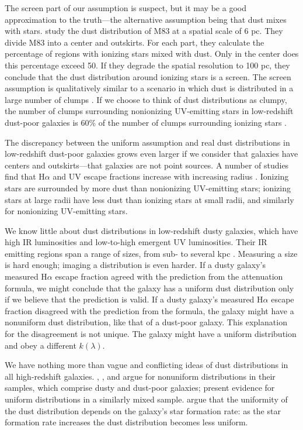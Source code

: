 \documentclass[preprint]{aastex}
\begin{document}
The screen part of our assumption is suspect, but it may be a
good approximation to the truth---the alternative assumption being that dust
mixes with stars.  \citet{liu13} study the dust distribution of M83 at a
spatial scale of 6 pc.  They divide M83 into a center and outskirts.  For each
part, they calculate the percentage of regions with ionizing stars mixed with
dust.  Only in the center does this percentage exceed 50.  If they degrade the
spatial resolution to 100 pc, they conclude that the dust distribution around
ionizing stars is a screen.  The screen assumption is qualitatively similar to
a scenario in which dust is distributed in a large number of clumps
\citep{calzetti94}.  If we choose to think of dust distributions as clumpy, the
number of clumps surrounding nonionizing UV-emitting stars in low-redshift
dust-poor galaxies is 60\% of the number of clumps surrounding ionizing stars
\citep{calzetti97a}.

The discrepancy between the uniform assumption and real dust
distributions in low-redshift dust-poor galaxies grows even larger if we
consider that galaxies have centers and outskirts---that galaxies are not
point sources.  A number of studies find
that H$\alpha$ and UV escape fractions increase with increasing radius
\citep{boissier04,prescott07,munoz09}.  Ionizing stars are surrounded by more
dust than nonionizing UV-emitting stars; ionizing stars
at large radii have less dust than ionizing stars at small radii, and similarly
for nonionizing UV-emitting stars.

We know little about dust distributions in low-redshift dusty galaxies, which
have high IR luminosities and low-to-high emergent UV luminosities.  Their
IR emitting regions span a range of sizes, from sub- to several kpc
\citep{diaz10}.  Measuring a size is hard enough; imaging a distribution is
even harder.  If a dusty galaxy's measured H$\alpha$ escape fraction agreed with
the prediction from the \citet{calzetti00} attenuation formula, we might
conclude that the galaxy has a uniform dust distribution only if we believe
that the prediction is valid.  If a dusty galaxy's measured H$\alpha$
escape fraction disagreed with the prediction from the \citet{calzetti00}
formula, the galaxy might have a nonuniform dust distribution, like that of a
dust-poor galaxy.  This explanation for the disagreement is not unique.  The
galaxy might have a uniform distribution and obey a different $k(\lambda)$.

We have nothing more than vague and conflicting ideas of dust distributions in
all high-redshift galaxies.  \citet{onodera10}, \citet{kashino13}, and 
\citet{price13} argue for nonuniform distributions in their samples, which
comprise dusty and dust-poor galaxies; \citet{erb06} present evidence for
uniform distributions in a similarly mixed sample.  \citet{reddy15} argue
that the uniformity of the dust distribution depends on the galaxy's
star formation rate: as the star formation rate increases the dust distribution
becomes less uniform.
\end{document}
